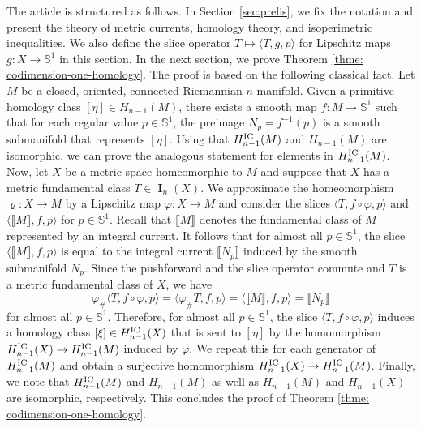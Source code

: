 \documentclass{amsart}
\numberwithin{equation}{section}
\DeclareMathOperator{\bI}{\mathbf{I}}
\newcommand{\bb}[1]{\llbracket #1\rrbracket}
\begin{document}
    \medskip

    The article is structured as follows. In Section \ref{sec:prelis}, we fix the notation and present the theory of metric currents, homology theory, and isoperimetric inequalities. We also define the slice operator $T \mapsto \langle T , g, p\rangle$ for Lipschitz maps $g\colon X \to \mathbb{S}^1$ in this section. In the next section, we prove Theorem \ref{thme: codimension-one-homology}. The proof is based on the following classical fact. Let $M$ be a closed, oriented, connected Riemannian $n$-manifold. Given a primitive homology class $[\eta] \in H_{n-1}(M)$, there exists a smooth map $f \colon M \to \mathbb{S}^1$ such that for each regular value $p \in \mathbb{S}^1$, the preimage $N_p = f^{-1}(p)$ is a smooth submanifold that represents $[\eta]$. Using that $H_{n-1}^\textup{IC}(M)$ and $H_{n-1}(M)$ are isomorphic, we can prove the analogous statement for elements in $H_{n-1}^\textup{IC}(M)$. Now, let $X$ be a metric space homeomorphic to $M$ and suppose that $X$ has a metric fundamental class $T \in \bI_n(X)$. We approximate the homeomorphism $\varrho\colon X \to M$ by a Lipschitz map $\varphi \colon X \to M$ and consider the slices $\langle T, f\circ \varphi, p\rangle$ and $\langle\bb{M}, f,p\rangle$ for $p \in \mathbb{S}^1$. Recall that $\bb{M}$ denotes the fundamental class of $M$ represented by an integral current. It follows that for almost all $p \in \mathbb{S}^1$, the slice $\langle\bb{M}, f,p\rangle$ is equal to the integral current $\bb{N_p}$ induced by the smooth submanifold $N_p$. Since the pushforward and the slice operator commute and $T$ is a metric fundamental class of $X$, we have
    $$\varphi_\#\langle T,f \circ \varphi, p\rangle = \langle\varphi_\#T,f,p\rangle = \langle \bb{M},f,p\rangle = \bb{N_p}$$
    for almost all $p \in \mathbb{S}^1$. Therefore, for almost all $p\in \mathbb{S}^1$, the slice $\langle T,f \circ\varphi , p\rangle$ induces a homology class $[\xi]\in H_{n-1}^\textup{IC}(X)$ that is sent to $[\eta]$ by the homomorphism $H_{n-1}^\textup{IC}(X)\to H_{n-1}^\textup{IC}(M)$ induced by $\varphi$. We repeat this for each generator of $H_{n-1}^\textup{IC}(M)$ and obtain a surjective homomorphism $H_{n-1}^\textup{IC}(X)\to H_{n-1}^\textup{IC}(M)$. Finally, we note that $H_{n-1}^\textup{IC}(M)$ and $ H_{n-1}(M)$ as well as $H_{n-1}(M)$ and $H_{n-1}(X)$ are isomorphic, respectively. This concludes the proof of Theorem \ref{thme: codimension-one-homology}.   
\end{document}
